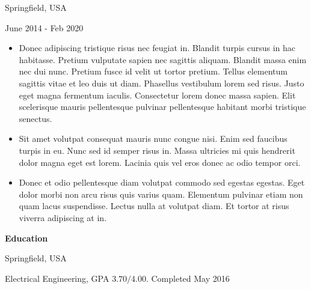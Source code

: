 \documentclass[letter,11pt]{article}
\begin{document}
 \hfill Springfield, USA

  \hfill June 2014 - Feb 2020

\vspace{1mm}
\begin{itemize}[itemsep=0.05mm,topsep=0mm, label=\textrm{•}] 

	\item Donec adipiscing tristique risus nec feugiat in. Blandit turpis cursus in hac habitasse. Pretium vulputate sapien nec sagittis aliquam. Blandit massa enim nec dui nunc. Pretium fusce id velit ut tortor pretium. Tellus elementum sagittis vitae et leo duis ut diam. Phasellus vestibulum lorem sed risus. Justo eget magna fermentum iaculis. Consectetur lorem donec massa sapien. Elit scelerisque mauris pellentesque pulvinar pellentesque habitant morbi tristique senectus. 

	\item Sit amet volutpat consequat mauris nunc congue nisi. Enim sed faucibus turpis in eu. Nunc sed id semper risus in. Massa ultricies mi quis hendrerit dolor magna eget est lorem. Lacinia quis vel eros donec ac odio tempor orci. 
	
	\item Donec et odio pellentesque diam volutpat commodo sed egestas egestas. Eget dolor morbi non arcu risus quis varius quam. Elementum pulvinar etiam non quam lacus suspendisse. Lectus nulla at volutpat diam. Et tortor at risus viverra adipiscing at in. 
			
			
			
\end{itemize}
\vspace{2mm}


\noindent\textbf {\large Education} \vspace{2mm}

 \hfill Springfield, USA

 Electrical Engineering, GPA $3.70/4.00.$ \hfill Completed May 2016
  
\vspace{2mm}
\end{document}
